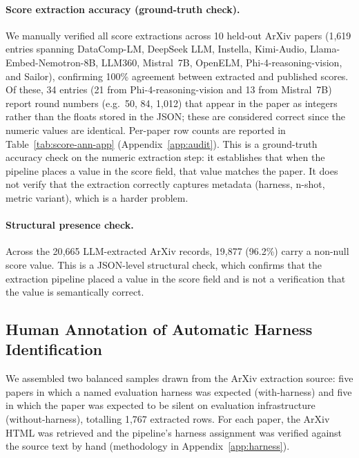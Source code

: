 \documentclass[11pt]{article}
\begin{document}
\paragraph{Score extraction accuracy (ground-truth check).}
We manually verified all score extractions across 10 held-out ArXiv papers
(1{,}619 entries spanning DataComp-LM, DeepSeek LLM, Instella, Kimi-Audio,
Llama-Embed-Nemotron-8B, LLM360, Mistral~7B, OpenELM,
Phi-4-reasoning-vision, and Sailor), confirming 100\% agreement between
extracted and published scores. Of these, 34 entries (21 from
Phi-4-reasoning-vision and 13 from Mistral~7B) report round numbers
(e.g.\ 50, 84, 1{,}012) that appear in the paper as integers rather than the
floats stored in the JSON; these are considered correct since the numeric
values are identical. Per-paper row counts are reported in
Table~\ref{tab:score-ann-app} (Appendix~\ref{app:audit}). This is a ground-truth accuracy check on the numeric extraction
step: it establishes that when the pipeline places a value in the score
field, that value matches the paper. It does not verify that the extraction
correctly captures metadata (harness, n-shot, metric variant), which is a
harder problem.

\paragraph{Structural presence check.}
Across the 20{,}665 LLM-extracted ArXiv records,
19{,}877 (96.2\%) carry a non-null score value. This is a JSON-level
structural check, which confirms that the extraction pipeline placed a value
in the score field and is not a verification that the value is semantically
correct. 

\subsection{Human Annotation of Automatic Harness Identification}
\label{sec:harness-ann}
We assembled two balanced samples drawn from the ArXiv extraction source: five
papers in which a named evaluation harness was expected (with-harness) and five in which the paper was expected to be silent on evaluation infrastructure
(without-harness), totalling 1{,}767 extracted rows. For each paper, the ArXiv
HTML was retrieved and the pipeline's harness assignment was verified against
the source text by hand (methodology in Appendix~\ref{app:harness}).
\end{document}
